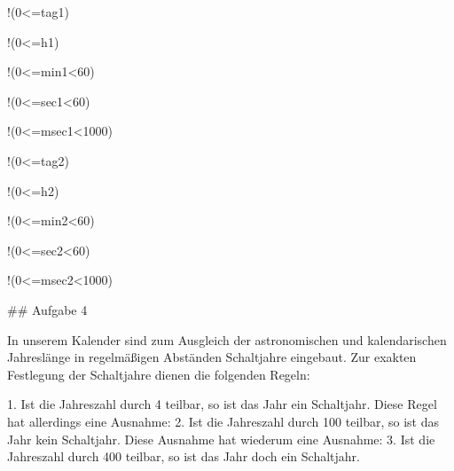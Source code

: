     \begin{flussdiagramm}
      \begin{while}{!(0<=tag1)}
        
      \end{while}
      \begin{while}{!(0<=h1)}
        
      \end{while}
      \begin{while}{!(0<=min1<60)}
        
      \end{while}
      \begin{while}{!(0<=sec1<60)}
        
      \end{while}
      \begin{while}{!(0<=msec1<1000)}
        
      \end{while}
      \begin{while}{!(0<=tag2)}
        
      \end{while}
      \begin{while}{!(0<=h2)}
        
      \end{while}
      \begin{while}{!(0<=min2<60)}
        
      \end{while}
      \begin{while}{!(0<=sec2<60)}
        
      \end{while}
      \begin{while}{!(0<=msec2<1000)}
        
      \end{while}
    \end{flussdiagramm}

## Aufgabe 4

In unserem Kalender sind zum Ausgleich der astronomischen und kalendarischen Jahreslänge in regelmäßigen Abständen Schaltjahre eingebaut. Zur exakten Festlegung der Schaltjahre dienen die folgenden Regeln:

1. Ist die Jahreszahl durch 4 teilbar, so ist das Jahr ein Schaltjahr. Diese Regel hat allerdings eine Ausnahme:
2. Ist die Jahreszahl durch 100 teilbar, so ist das Jahr kein Schaltjahr. Diese Ausnahme hat wiederum eine Ausnahme:
3. Ist die Jahreszahl durch 400 teilbar, so ist das Jahr doch ein Schaltjahr.

